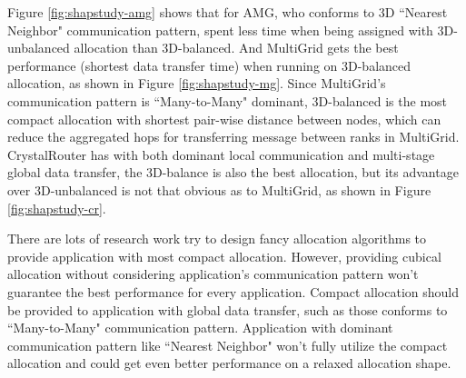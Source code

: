 \documentclass[conference]{IEEEtran}
\begin{document}
Figure \ref{fig:shapstudy-amg} shows that for AMG, who conforms to 3D ``Nearest Neighbor" communication pattern, spent less time when being assigned with 3D-unbalanced allocation than 3D-balanced. And MultiGrid gets the best performance (shortest data transfer time) when running on 3D-balanced allocation, as shown in Figure \ref{fig:shapstudy-mg}. Since MultiGrid's communication pattern is ``Many-to-Many" dominant, 3D-balanced is the most compact allocation with shortest pair-wise distance between nodes, which can reduce the aggregated hops for transferring message between ranks in MultiGrid. CrystalRouter has with both dominant local communication and multi-stage global data transfer, the 3D-balance is also the best allocation, but its advantage over 3D-unbalanced is not that obvious as to MultiGrid, as shown in Figure \ref{fig:shapstudy-cr}.

There are lots of research work try to design fancy allocation algorithms to provide application with most compact allocation. However, providing cubical allocation without considering application's communication pattern won't guarantee the best performance for every application. Compact allocation should be provided to application with global data transfer, such as those conforms to ``Many-to-Many" communication pattern. Application with dominant communication pattern like ``Nearest Neighbor" won't fully utilize the compact allocation and could get even better performance on a relaxed allocation shape. 
\end{document}
